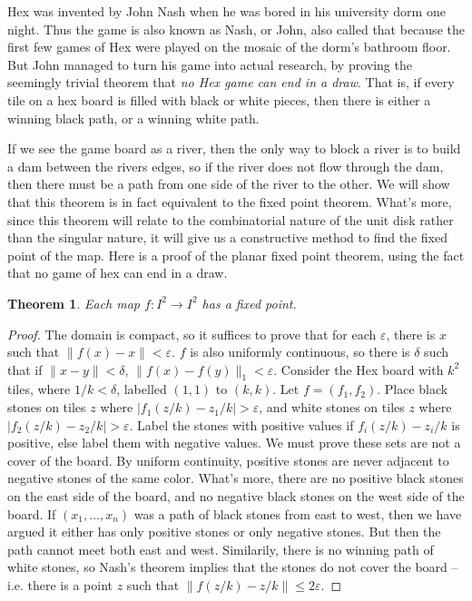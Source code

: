 \documentclass{article}
\theoremstyle{plain}
\newtheorem{theorem}{Theorem}
\begin{document}
Hex was invented by John Nash when he was bored in his university dorm one night. Thus the game is also known as Nash, or John, also called that because the first few games of Hex were played on the mosaic of the dorm's bathroom floor. But John managed to turn his game into actual research, by proving the seemingly trivial theorem that {\it no Hex game can end in a draw}. That is, if every tile on a hex board is filled with black or white pieces, then there is either a winning black path, or a winning white path.

If we see the game board as a river, then the only way to block a river is to build a dam between the rivers edges, so if the river does not flow through the dam, then there must be a path from one side of the river to the other. We will show that this theorem is in fact equivalent to the fixed point theorem. What's more, since this theorem will relate to the combinatorial nature of the unit disk rather than the singular nature, it will give us a constructive method to find the fixed point of the map. Here is a proof of the planar fixed point theorem, using the fact that no game of hex can end in a draw.

\begin{theorem}
    Each map $f: I^2 \to I^2$ has a fixed point.
\end{theorem}
\begin{proof}
    The domain is compact, so it suffices to prove that for each $\varepsilon$, there is $x$ such that $\| f(x) - x \| < \varepsilon$. $f$ is also uniformly continuous, so there is $\delta$ such that if $\| x - y \| < \delta$, $\| f(x) - f(y) \|_1 < \varepsilon$. Consider the Hex board with $k^2$ tiles, where $1/k < \delta$, labelled $(1,1)$ to $(k,k)$. Let $f = (f_1, f_2)$. Place black stones on tiles $z$ where $| f_1(z/k) - z_1/k | > \varepsilon$, and white stones on tiles $z$ where $| f_2(z/k) - z_2/k | > \varepsilon$. Label the stones with positive values if $f_i(z/k) - z_i/k$ is positive, else label them with negative values. We must prove these sets are not a cover of the board. By uniform continuity, positive stones are never adjacent to negative stones of the same color. What's more, there are no positive black stones on the east side of the board, and no negative black stones on the west side of the board. If $(x_1, \dots, x_n)$ was a path of black stones from east to west, then we have argued it either has only positive stones or only negative stones. But then the path cannot meet both east and west. Similarily, there is no winning path of white stones, so Nash's theorem implies that the stones do not cover the board -- i.e. there is a point $z$ such that $\| f(z/k) - z/k \| \leq 2 \varepsilon$.
\end{proof}
\end{document}
